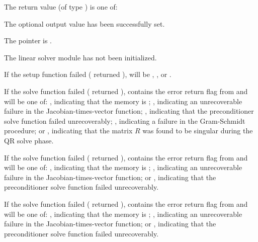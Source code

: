 {
  The return value  (of type ) is one of:
  \begin{args}
  \item[\Id{KINSPILS\_SUCCESS}] 
    The optional output value has been successfully set.
  \item[\Id{KINSPILS\_MEM\_NULL}]
    The  pointer is .
  \item[\Id{KINSPILS\_LMEM\_NULL}]
    The linear solver module has not been initialized.
  \end{args}
}
{
  If the {\kinspils} setup function failed ( returned
  ),  will be
  , , or
  .

  If the {\kinspgmr} solve function failed ( returned
  ),  contains the error return flag from
   and will be one of:
  , indicating that the {\spgmr} memory is ;
  , indicating an unrecoverable failure in the 
  Jacobian-times-vector function;
  , indicating that the preconditioner solve
  function  failed unrecoverably;
  , indicating a failure in the Gram-Schmidt procedure; 
  or , indicating that the matrix $R$ was found to be
  singular during the QR solve phase.

  If the {\kinspbcg} solve function failed ( returned
  ),  contains the error return flag from
   and will be one of:
  , indicating that the {\spbcg} memory is ;
  , indicating an unrecoverable failure in the 
  Jacobian-times-vector function; or
  , indicating that the preconditioner solve
  function  failed unrecoverably.

  If the {\kinsptfqmr} solve function failed ( returned
  ),  contains the error return flag from
   and will be one of:
  , indicating that the {\sptfqmr} memory is ;
  , indicating an unrecoverable failure in the 
  Jacobian-times-vector function; or
  , indicating that the preconditioner solve
  function  failed unrecoverably.
}


